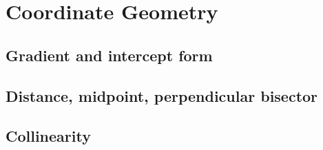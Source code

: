 
\section{Coordinate Geometry}

\subsection{Gradient and intercept form}


\subsection{Distance, midpoint, perpendicular bisector}


\subsection{Collinearity}

